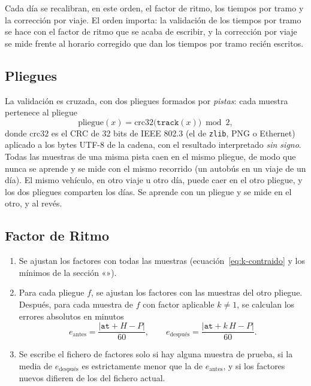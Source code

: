 Cada día se recalibran, en este orden, el factor de ritmo, los tiempos por tramo y la corrección por viaje. El orden
importa: la validación de los tiempos por tramo se hace con el factor de ritmo que se acaba de escribir, y la
corrección por viaje se mide frente al horario corregido que dan los tiempos por tramo recién escritos.

\subsection{Pliegues}

La validación es cruzada, con dos pliegues formados por \emph{pistas}: cada muestra pertenece al pliegue
\begin{equation}
\label{eq:pliegue}
\mathrm{pliegue}(x)=\mathrm{crc32}\big(\texttt{track}(x)\big)\bmod2,
\end{equation}
donde $\mathrm{crc32}$ es el CRC de 32 bits de IEEE 802.3 (el de \texttt{zlib}, PNG o Ethernet) aplicado a los bytes
UTF-8 de la cadena, con el resultado interpretado \emph{sin signo}. Todas las muestras de una misma pista caen en el mismo pliegue, de
modo que nunca se aprende y se mide con el mismo recorrido (un autobús en un viaje de un día). El mismo vehículo, en
otro viaje u otro día, puede caer en el otro pliegue, y los dos pliegues comparten los días. Se aprende con un pliegue
y se mide en el otro, y al revés.

\subsection{Factor de Ritmo}

\begin{enumerate}
  \item Se ajustan los factores con todas las muestras (ecuación~\eqref{eq:k-contraido} y los mínimos de la
        sección «»).
  \item Para cada pliegue $f$, se ajustan los factores con las muestras del otro pliegue. Después, para cada muestra
        de $f$ con factor aplicable $k\ne1$, se calculan los errores absolutos en minutos
        \[
        e_{\mathrm{antes}}=\frac{|\texttt{at}+H-P|}{60},\qquad e_{\text{después}}=\frac{|\texttt{at}+k\,H-P|}{60}.
        \]
  \item Se escribe el fichero de factores solo si hay alguna muestra de prueba, si la media de $e_{\text{después}}$
        es estrictamente menor que la de $e_{\mathrm{antes}}$, y si los factores nuevos difieren de los del fichero
        actual.
\end{enumerate}

